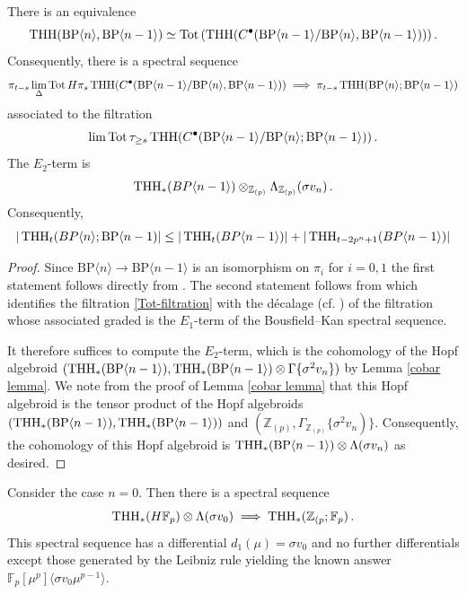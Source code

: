 \begin{proposition}\label{induction spectral sequence}
There is an equivalence 
\[ 
	\operatorname{THH}(\mathrm{BP}\langle n \rangle,\mathrm{BP}\langle n-1\rangle)\simeq \operatorname*{Tot} \left ( \operatorname{THH}(C^{\bullet}(\mathrm{BP}\langle n-1\rangle/\mathrm{BP}\langle n\rangle,\mathrm{BP}\langle n-1\rangle)) \right ).
\]
Consequently, there is a spectral sequence 
\[ 
	\pi_{t-s}\lim_{\Delta} \operatorname*{Tot} H\pi_s\operatorname{THH}(C^{\bullet}(\mathrm{BP}\langle n-1\rangle/\mathrm{BP}\langle n\rangle,\mathrm{BP}\langle n-1\rangle))\implies \pi_{t-s}\operatorname{THH}(\mathrm{BP}\langle n\rangle;\mathrm{BP}\langle n-1\rangle)
\]
associated to the filtration 
\begin{equation}\label{Tot-filtration}
	\lim \operatorname*{Tot} \tau_{\ge s}\operatorname{THH}(C^{\bullet}(\mathrm{BP}\langle n-1\rangle/\mathrm{BP}\langle n\rangle ;\mathrm{BP}\langle n-1\rangle))\,.
\end{equation}
The $E_2$-term is
\[ \operatorname{THH}_*(BP\langle n-1\rangle)\otimes_{\mathbb{Z}_{(p)}} \Lambda_{\mathbb{Z}_{(p)}} (\sigma v_n) \,.\]
Consequently,
\[ |\operatorname{THH}_{t}(BP\langle n \rangle;\mathrm{BP}\langle n-1)|\le |\operatorname{THH}_{t}(BP\langle n-1 \rangle)| + |\operatorname{THH}_{t-2p^{n}+1}(BP\langle n-1 \rangle)|\]
\end{proposition}
\begin{proof}
Since $\mathrm{BP}\langle n\rangle\to \mathrm{BP}\langle n-1\rangle$ is an isomorphism on $\pi_i$ for $i=0,1$ the first statement follows directly from \cite[Theorem 3.7]{DR18}. 
The second statement follows from \cite[Remark 3.7]{GIKR22} which identifies the filtration \eqref{Tot-filtration} with the d\'ecalage (cf. \cite[pp. 21]{Del71}) of the filtration whose associated graded is the $E_{1}$-term of the Bousfield--Kan spectral sequence. 

It therefore suffices to compute the $E_{2}$-term, which is the cohomology of the Hopf algebroid $(\operatorname{THH}_{*}(\mathrm{BP}\langle n-1\rangle), \operatorname{THH}_{*}(\mathrm{BP}\langle n-1\rangle)\otimes \Gamma \{ \sigma^{2}v_{n} \} )$ by Lemma \ref{cobar lemma}. 
We note from the proof of Lemma \ref{cobar lemma} that this Hopf algebroid is the tensor product of the Hopf algebroids 
$(\operatorname{THH}_{*}(\mathrm{BP}\langle n-1\rangle), \operatorname{THH}_{*}(\mathrm{BP}\langle n-1\rangle))$ and $(\mathbb{Z}_{(p)},\Gamma_{\mathbb{Z}_{(p)}} \{ \sigma^{2}v_{n})\} $. 
Consequently, the cohomology of this Hopf algebroid is $\operatorname{THH}_{*}(\mathrm{BP}\langle n-1\rangle )\otimes \Lambda (\sigma v_{n})$ as desired. 
\end{proof}

\begin{example}
Consider the case $n=0$. Then there is a spectral sequence 
\[ 
\operatorname{THH}_{*}(H\mathbb{F}_{p})\otimes \Lambda (\sigma v_{0})\implies \operatorname{THH}_{*}(\mathbb{Z}_{(p};\mathbb{F}_{p}) \,.
\]
This spectral sequence has a differential $d_{1}(\mu)=\sigma v_{0}$ and no further differentials except those generated by the Leibniz rule yielding the known answer $\mathbb{F}_p[\mu^p]\langle \sigma v_0 \mu^{p-1}\rangle$. 
\end{example}

